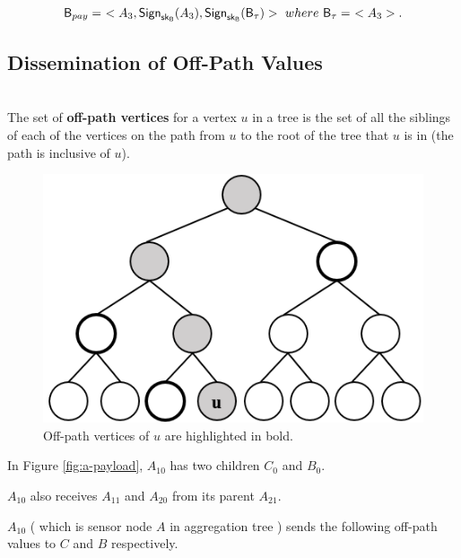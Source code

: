\documentclass[%
  slidesonly,%
  semlayer%
  ]{seminar}                                  %
\newenvironment{defn}{\noindent \\ \noindent{\bf Defn:}}{\hspace*{\fill} \newline}
\newcommand{\sk}{\sf{sk}}
\begin{document}
\begin{slide}
      \begin{equation*}
        \textsf{B}_{pay} =\ <A_{3}, \textsf{Sign}_{\sk_{\textsf{B}}}(A_{3}), \textsf{Sign}_{\sk_{\textsf{B}}}(\textsf{B}_{\tau})>\ where\ \textsf{B}_{\tau} =\ <A_{3}>.
      \end{equation*}
      \clearpage

      \subsection*{Dissemination of Off-Path Values}
        
        \begin{defn}
          The set of \textbf{off-path vertices} for a vertex $u$ in a tree is the set of all the siblings of each of the vertices on the path from $u$ to the root of the tree that $u$ is in (the path is inclusive of $u$).
        \end{defn}
        \begin{figure}[h!]
          \centering
          \includegraphics[scale = 0.4]{images/off-path.png}
          \caption{Off-path vertices of $u$ are highlighted in bold.}
          \label{fig:commitment-tree-example-2-shia}
        \end{figure}
        \clearpage

        In Figure \ref{fig:a-payload}, $A_{10}$ has two children $C_{0}$ and $B_{0}$.
        
        $A_{10}$ also receives $A_{11}$ and $A_{20}$ from its parent $A_{21}$.
        
        $A_{10}$ ( which is sensor node $A$ in aggregation tree ) sends the following off-path values to $C$ and $B$ respectively.
        
        

\end{slide}
\end{document}
